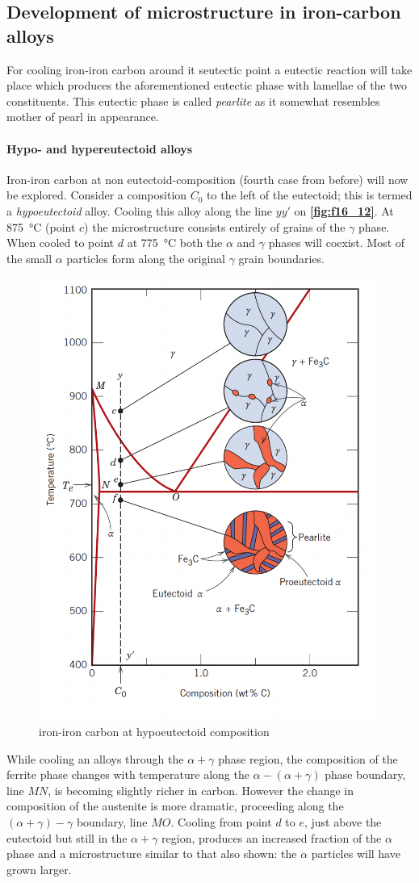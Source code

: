 \subsection{Development of microstructure in iron-carbon alloys}
For cooling iron-iron carbon around it seutectic point a eutectic reaction will take place which produces the aforementioned eutectic phase with lamellae of the two constituents. This eutectic phase is called \textit{pearlite} as it somewhat resembles mother of pearl in appearance. 

\paragraph{Hypo- and hypereutectoid alloys}
Iron-iron carbon at non eutectoid-composition (fourth case from before) will now be explored. Consider a composition $C_0$ to the left of the eutectoid; this is termed a \textit{hypoeutectoid} alloy. Cooling this alloy along the line $yy'$ on \textbf{\autoref{fig:f16_12}}. At \qty{875}{\celsius} (point $c$) the microstructure consists entirely of grains of the $\gamma$ phase. When cooled to point $d$ at \qty{775}{\celsius} both the $\alpha$ and $\gamma$ phases will coexist. Most of the small $\alpha$ particles form along the original $\gamma$ grain boundaries.

\begin{figure} [ht]
  \centering
  \includegraphics[width=0.35\linewidth]{./figures/f16_12.png}
  \caption{iron-iron carbon at hypoeutectoid composition}
  \label{fig:f16_12}
\end{figure}

While cooling an alloys through the $\alpha + \gamma$ phase region, the composition of the ferrite phase changes with temperature along the $\alpha-\left(\alpha + \gamma \right)$ phase boundary, line $MN$, is becoming slightly richer in carbon. However the change in composition of the austenite is more dramatic, proceeding along the $\left( \alpha + \gamma \right)-\gamma$ boundary, line $MO$. Cooling from point $d$ to $e$, just above the eutectoid but still in the $\alpha + \gamma$ region, produces an increased fraction of the $\alpha$ phase and a microstructure similar to that also shown: the $\alpha$ particles will have grown larger.

